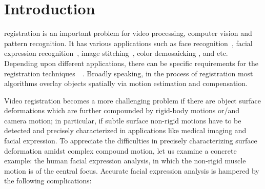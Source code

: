 \documentclass[10pt,journal]{IEEEtran}
\begin{document}
\IEEEdisplaynotcompsoctitleabstractindextext


%
\IEEEpeerreviewmaketitle


\section{Introduction}

 registration is an important problem for video processing, computer vision and pattern recognition. It has various applications such as face recognition~\cite{Wagner2009}, facial expression recognition~\cite{Valstar12}, image stitching~\cite{Szeliski06}, color demosaicking \cite{Wu_TIP06}, and etc. Depending upon different applications, there can be specific requirements for the registration techniques~\cite{Uenohara95}~\cite{Caspi_PAMI02}. Broadly speaking, in the process of registration most algorithms overlay objects spatially via motion estimation and compensation. 

Video registration becomes a more challenging problem if there are object surface deformations which are further compounded by rigid-body motions or/and camera motion; in particular, if subtle surface non-rigid motions have to be detected and precisely characterized in applications like medical imaging and facial expression. To appreciate the difficulties in precisely characterizing surface deformation amidst complex compound motion, let us examine a concrete example: the human facial expression analysis, in which the non-rigid muscle motion is of the central focus.  Accurate facial expression analysis is hampered by the following complications:
\end{document}
